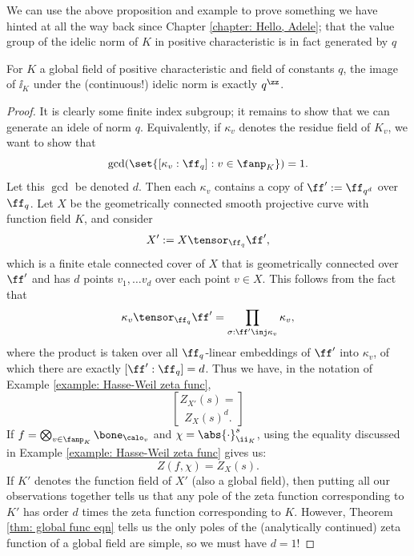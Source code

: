 \documentclass[11pt, x11names, openany]{book}
\begin{document}
We can use the above proposition and example to prove something we have hinted at all the way back since Chapter \ref{chapter: Hello, Adele}; that the value group of the idelic norm of $K$ in positive characteristic is in fact generated by $q$

\begin{prop}
    \label{prop: idelic norm image generated by q}
For $K$ a global field of positive characteristic and field of constants $q$, the image of $\ii_K$ under the (continuous!) idelic norm is exactly $q^\zz$.
\end{prop}
\begin{proof}
It is clearly some finite index subgroup; it remains to show that we can generate an idele of norm $q$. Equivalently, if $\kappa_v$ denotes the residue field of $K_v$, we want to show that
\begin{equation*}
    \gcd(\set{[\kappa_v: \ff_q]: v \in \fanp_K}) = 1.
\end{equation*}
Let this $\gcd$ be denoted $d$. Then each $\kappa_v$ contains a copy of $\ff' := \ff_{q^d}$ over $\ff_q$. Let $X$ be the geometrically connected smooth projective curve with function field $K$, and consider
\begin{equation*}
    X' := X \tensor_{\ff_q} \ff',
\end{equation*}
which is a finite etale connected cover of $X$ that is geometrically connected over $\ff'$ and has $d$ points $v_1, \ldots v_d$ over each point $v \in X$. This follows from the fact that
\begin{equation*}
    \kappa_v \tensor_{\ff_q} \ff' = \prod_{\sigma: \ff' \inj \kappa_v} \kappa_v,
\end{equation*}
where the product is taken over all $\ff_q$-linear embeddings of $\ff'$ into $\kappa_v$, of which there are exactly $[\ff' : \ff_q] = d$. Thus we have, in the notation of Example \ref{example: Hasse-Weil zeta func},
\begin{equation*}
    Z_{X'}(s) = \brack{Z_X(s)}^d.
\end{equation*}
If $f = \bigotimes_{v \in \fanp_K} \bone_{\calo_v}$ and $\chi = \abs{\cdot}^s_{\ii_K}$, using the equality discussed in Example \ref{example: Hasse-Weil zeta func} gives us:
\begin{equation*}
    Z(f, \chi) = Z_X(s).
\end{equation*}
If $K'$ denotes the function field of $X'$ (also a global field), then putting all our observations together tells us that any pole of the zeta function corresponding to $K'$ has order $d$ times the zeta function corresponding to $K$. However, Theorem \ref{thm: global func eqn} tells us the only poles of the (analytically continued) zeta function of a global field are simple, so we must have $d = 1$!
\end{proof}
\end{document}
